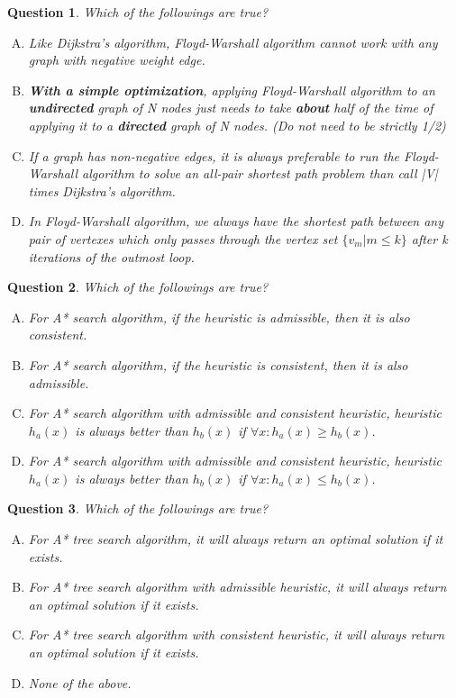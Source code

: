 \documentclass[10.5pt]{article}
\newtheorem{Q}{Question}
\begin{document}
\begin{Q}
	Which of the followings are true?
	\begin{enumerate}[(A)]
		\item Like Dijkstra's algorithm, Floyd-Warshall algorithm cannot work with any graph with negative weight edge.
		\item \textbf{With a simple optimization}, applying Floyd-Warshall algorithm to an \textbf{undirected} graph of N nodes just needs to take \textbf{about} half of the time of applying it to a \textbf{directed} graph of N nodes. (Do not need to be strictly 1/2)
		\item If a graph has non-negative edges, it is always preferable to run the Floyd-Warshall algorithm to solve an all-pair shortest path problem than call |V| times Dijkstra's algorithm.
		\item In Floyd-Warshall algorithm, we always have the shortest path between any pair of vertexes which only passes through the vertex set $\{v_m|m\leq k\}$ after k iterations of the outmost loop.
	\end{enumerate}
\end{Q}

\begin{Q}
	Which of the followings are true?
	\begin{enumerate}[(A)]
		\item For A* search algorithm, if the heuristic is admissible, then it is also consistent.
		\item For A* search algorithm, if the heuristic is consistent, then it is also admissible.
		\item For A* search algorithm with admissible and consistent heuristic, heuristic $h_a(x)$ is always better than $h_b(x)$ if $\forall x: h_a(x) \geq h_b(x)$.
		\item For A* search algorithm with admissible and consistent heuristic, heuristic $h_a(x)$ is always better than $h_b(x)$ if $\forall x: h_a(x) \leq h_b(x)$.
	\end{enumerate}
\end{Q}

\begin{Q}
	Which of the followings are true?
	\begin{enumerate}[(A)]
		\item For A* tree search algorithm, it will always return an optimal solution if it exists.
		\item For A* tree search algorithm with admissible heuristic, it will always return an optimal solution if it exists.
		\item For A*  tree search algorithm with consistent heuristic, it will always return an optimal solution if it exists.
		\item None of the above.
	\end{enumerate}
\end{Q}
\end{document}
